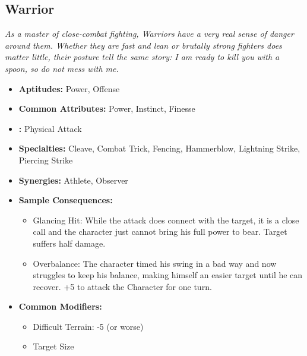 \subsection{Warrior}\label{Warrior}
\textit{As a master of close-combat fighting, Warriors have a very real sense of danger around them.
Whether they are fast and lean or brutally strong fighters does matter little, their posture tell the same story: 
I am ready to kill you with a spoon, so do not mess with me.}
\begin{itemize}
	\item \textbf{Aptitudes:} Power, Offense
	\item \textbf{Common Attributes:} Power, Instinct, Finesse 
	\item \textbf{:} Physical Attack
	\item \textbf{Specialties:} Cleave, Combat Trick, Fencing, Hammerblow, Lightning Strike, Piercing Strike
	\item \textbf{Synergies:} Athlete, Observer
	\item \textbf{Sample Consequences:} 
	\begin{itemize}
		\item Glancing Hit: While the attack does connect with the target, it is a close call and the character just cannot bring his full power to bear. Target suffers half damage.
		\item Overbalance: The character timed his swing in a bad way and now struggles to keep his balance, making himself an easier target until he can recover. +5 to attack the Character for one turn.
	\end{itemize}
	\item \textbf{Common Modifiers:}
	\begin{itemize}
		\item Difficult Terrain: -5 (or worse)
		\item Target Size
	\end{itemize}
\end{itemize}

